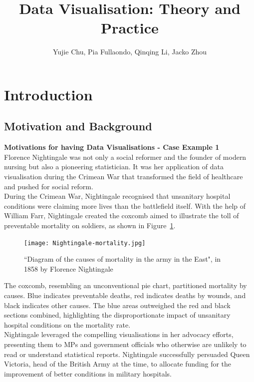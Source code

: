 \documentclass{article}\usepackage[]{graphicx}\usepackage[]{xcolor}
\title{Data Visualisation: Theory and Practice}
\author{Yujie Chu, Pia Fullaondo, Qinqing Li, Jacko Zhou}
\begin{document}
\newpage
\maketitle 
\tableofcontents
\newpage 

\section{Introduction}

\subsection{Motivation and Background}

\textbf{Motivations for having Data Visualisations - Case Example 1}\\

\noindent
Florence Nightingale was not only a social reformer and the founder of modern nursing but also a pioneering statistician. It was her application of data visualisation during the Crimean War that transformed the field of healthcare and pushed for social reform.\\  

\noindent
During the Crimean War, Nightingale recognised that unsanitary hospital conditions were claiming more lives than the battlefield itself. With the help of William Farr, Nightingale created the coxcomb aimed to illustrate the toll of preventable mortality on soldiers, as shown in Figure~\ref{fig:coxcomb}.

\begin{figure}[H]
    \centering
    \texttt{[image: Nightingale-mortality.jpg]}
    \caption{``Diagram of the causes of mortality in the army in the East", in 1858 by Florence Nightingale\cite{wikiFN}}
    \label{fig:coxcomb}
\end{figure}

\noindent 
The coxcomb, resembling an unconventional pie chart, partitioned mortality by causes. Blue indicates preventable deaths, red indicates deaths by wounds, and black indicates other causes.
The blue areas outweighed the red and black sections combined, highlighting the disproportionate impact of unsanitary hospital conditions on the mortality rate.\\

\noindent
Nightingale leveraged the compelling visualisations in her advocacy efforts, presenting them to MPs and government officials who otherwise are unlikely to read or understand statistical reports. Nightingale successfully persuaded Queen Victoria, head of the British Army at the time, to allocate funding for the improvement of better conditions in military hospitals.\\
\end{document}
